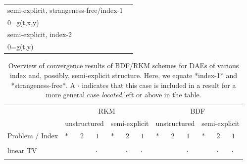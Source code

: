 \documentclass[]{book}
\theoremstyle{definition}
\theoremstyle{definition}
\theoremstyle{definition}
\theoremstyle{definition}
\theoremstyle{remark}
\begin{document}
\begin{longtable}[]{@{}ll@{}}
\begin{minipage}[t]{0.58\columnwidth}
semi-explicit, strangeness-free/index-1\strut
\end{minipage} & \begin{minipage}[t]{0.36\columnwidth}\raggedright
\(\begin{cases}\dot x= f(t, x, y) \\ 0=g(t,x,y) \end{cases}\)\strut
\end{minipage}\tabularnewline
\begin{minipage}[t]{0.58\columnwidth}\raggedright
semi-explicit, index-2\strut
\end{minipage} & \begin{minipage}[t]{0.36\columnwidth}\raggedright
\(\begin{cases}\dot x= f(t, x, y) \\ 0=g(t,y) \end{cases}\)\strut
\end{minipage}\tabularnewline
\bottomrule
\end{longtable}

\begin{table}

\caption{\label{tab:unnamed-chunk-1}Overview of convergence results of BDF/RKM schemes for DAEs of various index and, possibly, semi-explicit structure. Here, we equate *index-1* and *strangeness-free*. A $\cdot$ indicates that this case is included in a result for a more general case \emph{located} left or above in the table.}
\centering
\begin{tabular}[t]{lllllllllllll}
\toprule
\multicolumn{1}{c}{ } & \multicolumn{6}{c}{RKM} & \multicolumn{6}{c}{BDF} \\
\cmidrule(l{3pt}r{3pt}){2-7} \cmidrule(l{3pt}r{3pt}){8-13}
\multicolumn{1}{c}{ } & \multicolumn{3}{c}{unstructured} & \multicolumn{3}{c}{semi-explicit} & \multicolumn{3}{c}{unstructured} & \multicolumn{3}{c}{semi-explicit} \\
\cmidrule(l{3pt}r{3pt}){2-4} \cmidrule(l{3pt}r{3pt}){5-7} \cmidrule(l{3pt}r{3pt}){8-10} \cmidrule(l{3pt}r{3pt}){11-13}
Problem / Index & $*$ & $2$ & $1$ & $*$ & $2$ & $1$ & $*$ & $2$ & $1$ & $*$ & $2$ & $1$\\
\midrule
\cellcolor{gray!6}{nonlinear} & \cellcolor{gray!6}{} & \cellcolor{gray!6}{} & \cellcolor{gray!6}{c} & \cellcolor{gray!6}{} & \cellcolor{gray!6}{g,i} & \cellcolor{gray!6}{b} & \cellcolor{gray!6}{} & \cellcolor{gray!6}{} & \cellcolor{gray!6}{f} & \cellcolor{gray!6}{} & \cellcolor{gray!6}{h} & \cellcolor{gray!6}{e}\\
linear TV &  &  & $\cdot$ &  & $\cdot$ & $\cdot$ &  &  & $\cdot$ &  & $\cdot$ & $\cdot$\\
\cellcolor{gray!6}{linear CC} & \cellcolor{gray!6}{a} & \cellcolor{gray!6}{$\cdot$} & \cellcolor{gray!6}{$\cdot$} & \cellcolor{gray!6}{$\cdot$} & \cellcolor{gray!6}{$\cdot$} & \cellcolor{gray!6}{$\cdot$} & \cellcolor{gray!6}{d} & \cellcolor{gray!6}{$\cdot$} & \cellcolor{gray!6}{$\cdot$} & \cellcolor{gray!6}{$\cdot$} & \cellcolor{gray!6}{$\cdot$} & \cellcolor{gray!6}{$\cdot$}\\
\bottomrule
\end{tabular}
\end{table}
\end{document}
